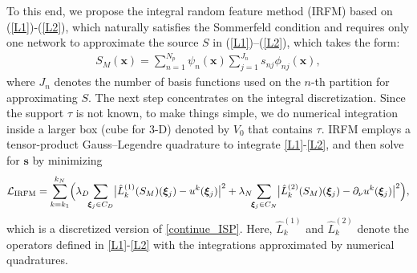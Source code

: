 \documentclass{article}
\theoremstyle{plain}
\theoremstyle{definition}
\begin{document}
To this end, we propose the integral random feature method (IRFM) based on (\ref{L1})-(\ref{L2}), which naturally satisfies the Sommerfeld condition and requires only one network to approximate the source $S$ in (\ref{L1})--(\ref{L2}), which takes the form: %
\begin{align} \label{eq:S-approx}
S_{M}(\boldsymbol{x})=\sum_{n=1}^{N_p}\psi_{n}(\boldsymbol{x})\sum_{j=1}^{J_{n}}s_{nj}\phi_{nj}(\boldsymbol{x}),
\end{align}
 {where $J_{n}$ denotes the number of basis functions used on the $n$-th partition for approximating $S$.}
The next step concentrates on the integral discretization. 
Since the support $\tau$ is not known, to make things simple, we do numerical integration inside a larger box (cube for 3-D) denoted by $V_0$ that contains $\tau$.
IRFM employs a tensor-product Gauss--Legendre quadrature to integrate \eqref{L1}-\eqref{L2}, and then solve for $\boldsymbol{s}$ by minimizing 
\begin{align}
    \label{IRFM_LOSS}
\mathcal{L}_{\text{IRFM}} = \sum_{k=k_1}^{k_N} \Bigl(
\lambda_{D}\!\!\sum_{\boldsymbol{\xi}_j\in C_D}\bigl|\hat{L}_k^{(1)}(S_M)(\boldsymbol{\xi}_j)-u^k (\boldsymbol{\xi}_j)\bigr|^2
+ \lambda_{N}\!\!\sum_{\boldsymbol{\xi}_j\in C_N}\bigl|\hat{L}_k^{(2)}(S_M)(\boldsymbol{\xi}_j)-\partial_\nu u^k (\boldsymbol{\xi}_j)\bigr|^2 \Bigr),
\end{align}
which is a discretized version of \eqref{continue_ISP}. Here, $\hat{L}_k^{(1)}$ and $\hat{L}_k^{(2)}$ denote the operators defined in  \eqref{L1}-\eqref{L2} with the integrations approximated by numerical quadratures.
\end{document}
